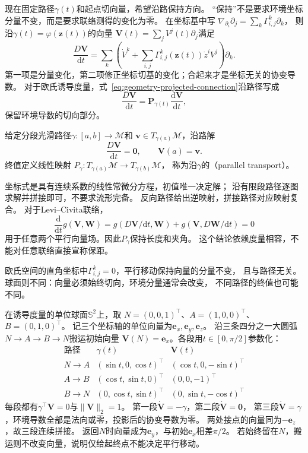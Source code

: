 现在固定路径$\gamma(t)$和起点切向量，希望沿路保持方向。
“保持”不是要求环境坐标分量不变，而是要求联络测得的变化为零。
在坐标基中写
$\nabla_{\partial_i}\partial_j=\sum_k\Gamma^k_{i,j}\partial_k$，
则沿$\gamma(t)=\varphi(\bm z(t))$的向量
$\bm V(t)=\sum_jV^j(t)\partial_j$满足
\begin{equation}
 \frac{D\bm V}{\mathrm dt}
 =\sum_k\left(\dot V^k+
     \sum_{i,j}\Gamma^k_{i,j}(\bm z(t))\dot z^iV^j\right)\partial_k.
 \label{eq:geometry-covariant-derivative-along-path}
\end{equation}
第一项是分量变化，第二项修正坐标切基的变化；合起来才是坐标无关的协变导数。
对于欧氏诱导度量，式~\eqref{eq:geometry-projected-connection}沿路径写成
\[
 \frac{D\bm V}{\mathrm dt}
 =\bm P_{\gamma(t)}\frac{\mathrm d\bm V}{\mathrm dt},
\]
保留环境导数的切向部分。

\begin{definition}[平行移动]
\label{def:geometry-parallel-transport}
给定分段光滑路径$\gamma:[a,b]\to\mathcal M$和
$\bm v\in T_{\gamma(a)}\mathcal M$，沿路解
\[
 \frac{D\bm V}{\mathrm dt}=\bm0,\qquad \bm V(a)=\bm v.
\]
终值定义线性映射
$P_\gamma:T_{\gamma(a)}\mathcal M\to T_{\gamma(b)}\mathcal M$，
称为沿$\gamma$的（parallel transport）。
\end{definition}
坐标式是具有连续系数的线性常微分方程，初值唯一决定解；
沿有限段路径逐图求解并拼接即可，不要求流形完备。
反向路径给出逆映射，拼接路径对应映射复合。
对于Levi--Civita联络，
\[
 \frac{\mathrm d}{\mathrm dt}g(\bm V,\bm W)
 =g(D\bm V/\mathrm dt,\bm W)+g(\bm V,D\bm W/\mathrm dt)=0
\]
用于任意两个平行向量场。因此$P_\gamma$保持长度和夹角。
这个结论依赖度量相容，不能对任意联络直接宣称保距。

欧氏空间的直角坐标中$\Gamma^k_{i,j}=0$，平行移动保持向量的分量不变，
且与路径无关。球面则不同：向量必须始终切向，环境分量通常会改变，
不同路径的终值也可能不同。

\begin{example}[球面三段路径上的方向搬运]
\label{ex:geometry-sphere-parallel-transport}
在诱导度量的单位球面$\mathbb S^2$上，取
$N=(0,0,1)^\top$、$A=(1,0,0)^\top$、$B=(0,1,0)^\top$。
记三个坐标轴的单位向量为$\bm e_x,\bm e_y,\bm e_z$。
沿三条四分之一大圆弧$N\to A\to B\to N$搬运初始向量
$\bm V(N)=\bm e_x$。各段用$t\in[0,\pi/2]$参数化：
\[
 \begin{array}{c|c|c}
  \text{路径}&\gamma(t)&\bm V(t)\\ \hline
  N\to A&(\sin t,0,\cos t)^\top&(\cos t,0,-\sin t)^\top\\
  A\to B&(\cos t,\sin t,0)^\top&(0,0,-1)^\top\\
  B\to N&(0,\cos t,\sin t)^\top&(0,\sin t,-\cos t)^\top
 \end{array}
\]
每段都有$\gamma^\top\bm V=0$与$\lVert\bm V\rVert_2=1$。
第一段$\dot{\bm V}=-\gamma$，第二段$\dot{\bm V}=\bm0$，
第三段$\dot{\bm V}=\gamma$，环境导数全部是法向或零，投影后的协变导数为零。
两处接点的向量同为$-\bm e_z$，故三段连续拼接。
返回$N$时向量成为$\bm e_y$，与初始$\bm e_x$相差$\pi/2$。
若始终留在$N$，搬运则不改变向量，说明仅给起终点不能决定平行移动。
\end{example}

